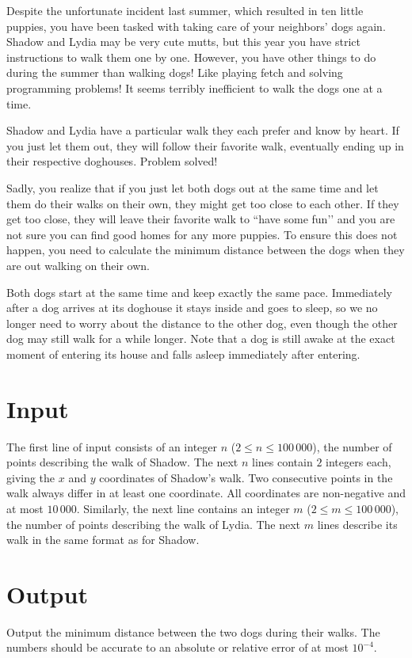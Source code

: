 
%
\noindent
Despite the unfortunate incident last summer, which resulted in ten little puppies, you have been tasked with taking care of your neighbors’ dogs again. Shadow and Lydia may be very cute mutts, but this year you have strict instructions to walk them one by one. However, you have other things to do during the summer than walking dogs! Like playing fetch and solving programming problems! It seems terribly inefficient to walk the dogs one at a time.

Shadow and Lydia have a particular walk they each prefer and know by heart. If you just let them out, they will follow their favorite walk, eventually ending up in their respective doghouses. Problem solved!

Sadly, you realize that if you just let both dogs out at the same time and let them do their walks on their own, they might get too close to each other. If they get too close, they will leave their favorite walk to ``have some fun’’ and you are not sure you can find good homes for any more puppies. To ensure this does not happen, you need to calculate the minimum distance between the dogs when they are out walking on their own.

Both dogs start at the same time and keep exactly the same pace. Immediately after a dog arrives at its doghouse it stays inside and goes to sleep, so we no longer need to worry about the distance to the other dog, even though the other dog may still walk for a while longer. Note that a dog is still awake at the exact moment of entering its house and falls asleep immediately after entering.

\section*{Input}

The first line of input consists of an integer $n$ ($2 \le n \le 100\,000$), the number of points
describing the walk of Shadow. The next $n$ lines contain $2$ integers each, giving the $x$ and $y$
coordinates of Shadow's walk. Two consecutive points in the walk always differ in at least one
coordinate. All coordinates are non-negative and at most $10\,000$. Similarly, the next line
contains an integer $m$ ($2 \le m \le 100\,000$), the number of points describing the walk of Lydia. The
next $m$ lines describe its walk in the same format as for Shadow.

\section*{Output}

Output the minimum distance between the two dogs during their walks. The numbers should be accurate
to an absolute or relative error of at most $10^{-4}$.
